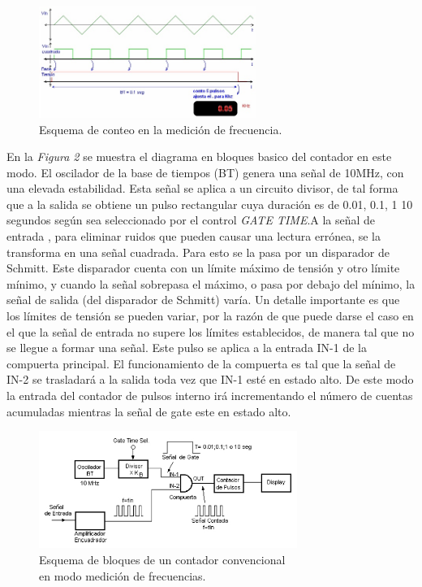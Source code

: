 \documentclass{article}
\begin{document}
\begin{figure}[h]
	\centering
	\includegraphics[width=0.63\textwidth]{images/01-ondasFrecuenciaContador.jpg}
	\medskip
	\caption{Esquema de conteo en la medición de frecuencia.}
\end{figure}
\bigskip\bigskip

	
	En la \textit{Figura 2} se muestra el diagrama en bloques basico del contador en este modo. El oscilador de la base de tiempos (BT) genera una señal de 10MHz, con una elevada estabilidad. Esta señal se aplica a un circuito divisor, de tal forma que a la salida se obtiene un pulso rectangular cuya duración es de 0.01, 0.1, 1  10 segundos según sea seleccionado por el control \textit{GATE TIME}.A la señal de entrada , para eliminar ruidos que pueden causar una lectura errónea, se la transforma en una señal cuadrada. Para esto se la pasa por un disparador de Schmitt. Este disparador cuenta con un límite máximo de tensión y otro límite mínimo, y cuando la señal sobrepasa el máximo, o pasa por debajo del mínimo, la señal de salida (del disparador de Schmitt) varía. Un detalle importante es que los límites de tensión se pueden variar, por la razón de que puede darse el caso en el que la señal de entrada no supere los límites establecidos, de manera tal que no se llegue a formar una señal. Este pulso se aplica a la entrada IN-1 de la compuerta principal. El funcionamiento de la compuerta es tal que la señal de IN-2 se trasladará a la salida toda vez que IN-1 esté en estado alto. De este modo la entrada del contador de pulsos interno irá incrementando el número de cuentas acumuladas mientras la señal de gate este en estado alto. 
\bigskip


\newpage
\begin{figure}[h]
	\centering
	\includegraphics[width=0.75\textwidth]{images/02-diagrama-en-bloques-modo-medicion-frecuencia.jpg}
	\medskip
	\caption{Esquema de bloques de un contador convencional\\ en modo medición de frecuencias.}
\end{figure}
\bigskip\bigskip
\end{document}
